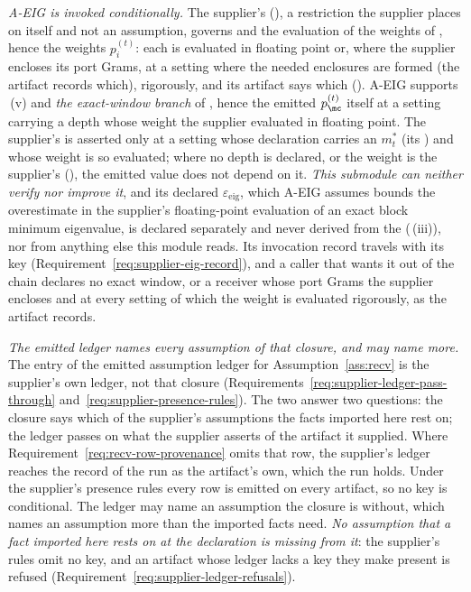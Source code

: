 \begin{remark}
\emph{A-EIG is invoked conditionally.} The supplier's 
(), a restriction the
supplier places on itself and not an assumption, governs
 and the evaluation of the weights of
, hence the weights $p^{(t)}_i$: each is
evaluated in floating point or, where the supplier encloses its port Grams,
at a setting where the needed enclosures are formed (the artifact records
which), rigorously, and its artifact says which
(). A-EIG
supports \,(v) and \emph{the
exact-window branch} of , hence the emitted
$p^{(t)}_{\mc}$ itself at a setting carrying a depth whose weight the supplier
evaluated in floating point. The supplier's
 is asserted only at a setting whose declaration
carries an  $m^{\ast}_t$ (its
) and whose weight is so evaluated; where no depth is
declared, or the weight is the supplier's 
(), the emitted value does not depend on
it. \emph{This submodule can neither verify nor improve
it}, and its declared  $\varepsilon_{\mathrm{eig}}$,
which A-EIG assumes bounds the overestimate in the supplier's floating-point
evaluation of an exact block minimum eigenvalue, is declared separately and
never derived from the 
(\,(iii)), nor from anything else this
module reads. Its invocation record travels with its key
(Requirement~\ref{req:supplier-eig-record}), and a caller that wants it out of
the chain declares no exact window, or a receiver whose port Grams the
supplier encloses and at every setting of which the weight is evaluated
rigorously, as the artifact records.

\emph{The emitted ledger names every assumption of that closure, and may name
more.} The entry of the emitted assumption ledger for
Assumption~\ref{ass:recv} is the supplier's own ledger, not that closure
(Requirements~\ref{req:supplier-ledger-pass-through}
and~\ref{req:supplier-presence-rules}). The two answer two questions: the
closure says which of the supplier's assumptions the facts imported here rest
on; the ledger passes on what the supplier asserts of the artifact it
supplied. Where Requirement~\ref{req:recv-row-provenance} omits that row,
the supplier's ledger reaches the record of the run as the artifact's own,
which the run holds. Under the supplier's presence rules every row is emitted on every
artifact, so no key is conditional. The ledger may name an assumption the
closure is without, which names an assumption more than the imported facts
need. \emph{No assumption that a fact imported here rests on at the
declaration is missing from it}: the supplier's rules omit no key, and an
artifact whose ledger lacks a key they make present is refused
(Requirement~\ref{req:supplier-ledger-refusals}).


\end{remark}
